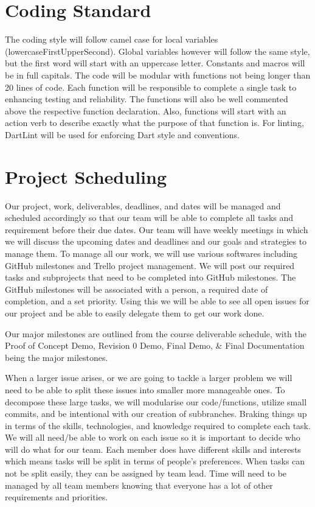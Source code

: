 \documentclass{article}
\begin{document}
\section{Coding Standard}

The coding style will follow camel case for local variables (lowercaseFirstUpperSecond). Global variables however will follow the same style, but the first word will start with an uppercase letter. Constants and macros will be in full capitals. The code will be modular with functions not being longer than 20 lines of code. Each function will be responsible to complete a single task to enhancing testing and reliability. The functions will also be well commented above the respective function declaration. Also, functions will start with an action verb to describe exactly what the purpose of that function is. For linting, DartLint will be used for enforcing Dart style and conventions.

\section{Project Scheduling}

Our project, work, deliverables, deadlines, and dates will be managed and scheduled accordingly so that our team will be able to complete all tasks and requirement before their due dates. Our team will have weekly meetings in which we will discuss the upcoming dates and deadlines and our goals and strategies to manage them. To manage all our work, we will use various softwares including GitHub milestones and Trello project management. We will post our required tasks and subprojects that need to be completed into GitHub milestones. The GitHub milestones will be associated with a person, a required date of completion, and a set priority. Using this we will be able to see all open issues for our project and be able to easily delegate them to get our work done. 

	Our major milestones are outlined from the course deliverable schedule, with the Proof of Concept Demo, Revision 0 Demo, Final Demo, \& Final Documentation being the major milestones. 

	When a larger issue arises, or we are going to tackle a larger problem we will need to be able to split these issues into smaller more manageable ones. To decompose these large tasks, we will modularise our code/functions, utilize small commits, and be intentional with our creation of subbranches. Braking things up in terms of the skills, technologies, and knowledge required to complete each task. We will all need/be able to work on each issue so it is important to decide who will do what for our team. Each member does have different skills and interests which means tasks will be split in terms of people’s preferences. When tasks can not be split easily, they can be assigned by team lead. Time will need to be managed by all team members knowing that everyone has a lot of other requirements and priorities.
\end{document}
